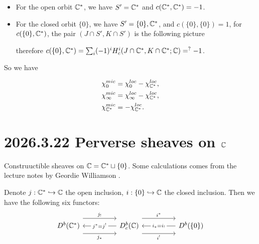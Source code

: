 \documentclass[12pt]{amsart}
\numberwithin{equation}{section}
\begin{document}
\begin{itemize}
  \item For the open orbit ${\mathbb {C}}^*$, we have $S' = {\mathbb {C}}^*$ and $c({\mathbb {C}}^*,{\mathbb {C}}^*) = -1$.
  \item For the closed orbit $\{0\}$, we have $S' = \{0\}, {\mathbb {C}}^*$, and $c(\{0\},\{0\}) = 1$, for $c(\{0\},{\mathbb {C}}^*)$, the pair $(J \cap S', K \cap S')$ is the following picture

\begin{center}
\end{center}
therefore $c(\{0\},{\mathbb {C}}^*) = \sum_i (-1)^i H^i_c(J \cap {\mathbb {C}}^*, K \cap {\mathbb {C}}^*; {\mathbb {C}}) =^{?} -1$.
\end{itemize}


So we have

\begin{align*}
  \chi^{mic}_{0} &= \chi^{loc}_{0} - \chi^{loc}_{{\mathbb {C}}^*}, \\ 
  \chi^{mic}_{\infty} &= \chi^{loc}_{\infty} - \chi^{loc}_{{\mathbb {C}}^*}, \\
  \chi^{mic}_{{\mathbb {C}}^*} &= -\chi^{loc}_{{\mathbb {C}}^*}.
\end{align*}
 


\section{2026.3.22 Perverse sheaves on ${\mathbb {C}}$}

Construuctible sheaves on ${\mathbb {C}} = {\mathbb {C}}^* \sqcup \{0\}$. Some calculations comes from the lecture notes by Geordie Williamson \cite{Wil15}.

Denote $j: {\mathbb {C}}^* \hookrightarrow {\mathbb {C}}$ the open inclusion, $i: \{0\} \hookrightarrow {\mathbb {C}}$ the closed inclusion. Then we have the following six functors:
\[
\begin{tikzcd}[column sep=huge]
  D^b(\mathbb{C}^*) 
  \arrow[r, shift left=2.5ex, "j_!"]  
  \arrow[r, shift right=2.5ex, "j_*"'] 
  & D^b_c(\mathbb{C}) 
  \arrow[r, shift left=2.5ex, "i^*"] 
  \arrow[r, shift right=2.5ex, "i^!"']
  \arrow[l, "j^{*} = j^!" description] 
  & D^b(\{0\})
  \arrow[l, "i_* = i_!" description]
\end{tikzcd}
\]
\end{document}
